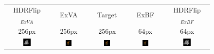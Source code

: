 
\begingroup
\begin{figure}[!htb]
    \centering
    \setlength\tabcolsep{2pt}
    \begin{tabular*}{\textwidth}{ c c c c c }
        HDRFlip$_{ExVA}$ & ExVA & Target & ExBF & HDRFlip$_{ExBF}$ \\
        256px & 256px & 256px & 64px & 64px \\
        
          \includegraphics[width=0.19\textwidth]{figures/results/arb_set/validation/lego6_exva_hdrflip_150k.png}
        & \includegraphics[width=0.19\textwidth]{figures/results/arb_set/validation/lego6_exva_150k.png}
        & \includegraphics[width=0.19\textwidth]{figures/results/arb_set/validation/lego6_targ_256px.png}
        & \includegraphics[width=0.19\textwidth]{figures/results/arb_set/validation/lego6_exbf_112k.png}
        & \includegraphics[width=0.19\textwidth]{figures/results/arb_set/validation/lego6_exbf_hdrflip_112k.png} \\[-6pt]
        

\end{tabular*}
\end{figure}
